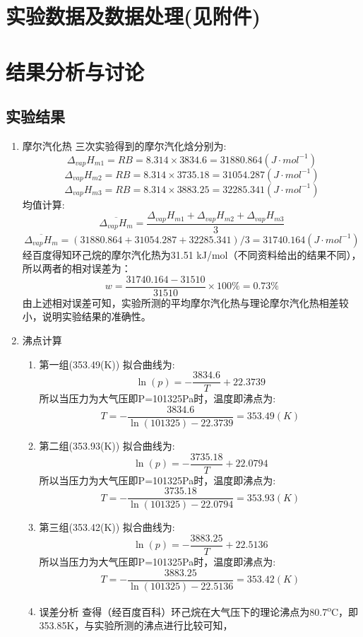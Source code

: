 \documentclass[11pt]{report}
\begin{document}
\chapter{实验数据及数据处理(见附件)}
\label{sec:org56b5e58}
\chapter{结果分析与讨论}
\label{sec:orgc09fc53}
\section{实验结果}
\label{sec:org2e93902}
\begin{enumerate}
\item 摩尔汽化热
\label{sec:org60a1960}
三次实验得到的摩尔汽化焓分别为:
\[
    \Delta_{vap}H_{m1}=RB=8.314\times 3834.6=31880.864(J\cdot mol^{-1})
    \]
\[
    \Delta_{vap}H_{m2}=RB=8.314\times 3735.18=31054.287(J\cdot mol^{-1})
    \]
\[
    \Delta_{vap}H_{m3}=RB=8.314\times 3883.25=32285.341(J\cdot mol^{-1})
    \]
均值计算:
\[
    \overline{\Delta_{vap}H_{m}}=\frac{\Delta_{vap}H_{m1}+\Delta_{vap}H_{m2}+\Delta_{vap}H_{m3}}{3}
    \]
\[
    \overline{\Delta_{vap}H_{m}}=(31880.864+31054.287+32285.341)/3=31740.164(J\cdot mol^{-1})
    \]
经百度得知环己烷的摩尔汽化热为31.51 kJ/mol（不同资料给出的结果不同），所以两者的相对误差为：
\[
    w=\frac{31740.164-31510}{31510}\times 100\% =0.73\%
    \]
由上述相对误差可知，实验所测的平均摩尔汽化热与理论摩尔汽化热相差较小，说明实验结果的准确性。
\item 沸点计算
\label{sec:org8811b4b}
\begin{enumerate}
\item 第一组(353.49(K))
\label{sec:org633cd71}
拟合曲线为:
\[
     \ln(p)=-\frac{3834.6}{T}+22.3739
     \]
所以当压力为大气压即P=101325Pa时，温度即沸点为:
\[
     T=-\frac{3834.6}{\ln(101325)-22.3739}=353.49(K)
     \]
\item 第二组(353.93(K))
\label{sec:orgc8adf8e}
拟合曲线为:
\[
     \ln(p)=-\frac{3735.18}{T}+22.0794
     \]
所以当压力为大气压即P=101325Pa时，温度即沸点为:
\[
     T=-\frac{3735.18}{\ln(101325)-22.0794}=353.93(K)
     \]
\item 第三组(353.42(K))
\label{sec:org8ebfafc}
拟合曲线为:
\[
     \ln(p)=-\frac{3883.25}{T}+22.5136
     \]
所以当压力为大气压即P=101325Pa时，温度即沸点为:
\[
     T=-\frac{3883.25}{\ln(101325)-22.5136}=353.42(K)
     \]
\item 误差分析
\label{sec:org5e56687}
查得（经百度百科）环己烷在大气压下的理论沸点为80.7\textsuperscript{o}C，即353.85K，与实验所测的沸点进行比较可知，

\end{enumerate}
\end{enumerate}
\end{document}
